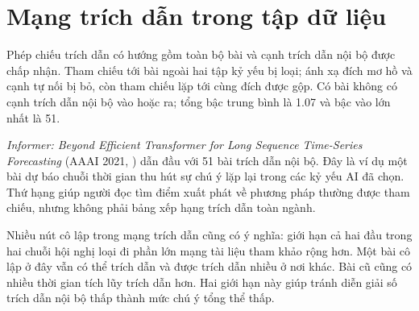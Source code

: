 \section{Mạng trích dẫn trong tập dữ liệu}
Phép chiếu trích dẫn có hướng gồm toàn bộ \Papers{} bài và \CitationEdges{}
cạnh trích dẫn nội bộ được chấp nhận. Tham chiếu tới bài ngoài hai tập kỷ yếu
bị loại; ánh xạ đích mơ hồ và cạnh tự nối bị bỏ, còn tham chiếu lặp tới
cùng đích được gộp. Có \CitationIsolates{} bài không có cạnh trích dẫn nội bộ
vào hoặc ra; tổng bậc trung bình là 1.07 và bậc vào lớn nhất là 51.

\FloatBarrier

\emph{Informer: Beyond Efficient Transformer for Long Sequence Time-Series
Forecasting} (AAAI 2021, ) dẫn đầu với 51
bài trích dẫn nội bộ. Đây là ví dụ một bài dự báo chuỗi thời gian thu hút sự
chú ý lặp lại trong các kỷ yếu AI đã chọn. Thứ hạng giúp người đọc tìm điểm
xuất phát về phương pháp thường được tham chiếu, nhưng không phải bảng xếp
hạng trích dẫn toàn ngành.

Nhiều nút cô lập trong mạng trích dẫn cũng có ý nghĩa: giới hạn cả hai đầu
trong hai chuỗi hội nghị loại đi phần lớn mạng tài liệu tham khảo rộng hơn.
Một bài cô lập ở đây vẫn có thể trích dẫn và được trích dẫn nhiều ở nơi khác.
Bài cũ cũng có nhiều thời gian tích lũy trích dẫn hơn. Hai giới hạn này giúp
tránh diễn giải số trích dẫn nội bộ thấp thành mức chú ý tổng thể thấp.

